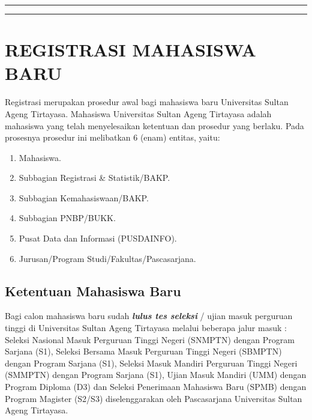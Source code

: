 \documentclass[
]{book}
\providecommand{\tightlist}{%
  \setlength{\itemsep}{0pt}\setlength{\parskip}{0pt}}
\begin{document}
\begin{center}\rule{0.5\linewidth}{0.5pt}\end{center}

\begin{center}\rule{0.5\linewidth}{0.5pt}\end{center}

\hypertarget{registrasi-mahasiswa-baru}{%
\chapter{REGISTRASI MAHASISWA BARU}\label{registrasi-mahasiswa-baru}}

Registrasi merupakan prosedur awal bagi mahasiswa baru Universitas Sultan Ageng Tirtayasa. Mahasiswa Universitas Sultan Ageng Tirtayasa adalah mahasiswa yang telah menyelesaikan ketentuan dan prosedur yang berlaku. Pada prosesnya prosedur ini melibatkan 6 (enam) entitas, yaitu:

\begin{enumerate}
\def\labelenumi{\arabic{enumi}.}
\tightlist
\item
  Mahasiswa.
\item
  Subbagian Registrasi \& Statistik/BAKP.
\item
  Subbagian Kemahasiswaan/BAKP.
\item
  Subbagian PNBP/BUKK.
\item
  Pusat Data dan Informasi (PUSDAINFO).
\item
  Jurusan/Program Studi/Fakultas/Pascasarjana.
\end{enumerate}

\hypertarget{ketentuan-mahasiswa-baru}{%
\section{Ketentuan Mahasiswa Baru}\label{ketentuan-mahasiswa-baru}}

Bagi calon mahasiswa baru sudah \textbf{\emph{lulus tes seleksi}} / ujian masuk perguruan tinggi di Universitas Sultan Ageng Tirtayasa melalui beberapa jalur masuk : Seleksi Nasional Masuk Perguruan Tinggi Negeri (SNMPTN) dengan Program Sarjana (S1), Seleksi Bersama Masuk Perguruan Tinggi Negeri (SBMPTN) dengan Program Sarjana (S1), Seleksi Masuk Mandiri Perguruan Tinggi Negeri (SMMPTN) dengan Program Sarjana (S1), Ujian Masuk Mandiri (UMM) dengan Program Diploma (D3) dan Seleksi Penerimaan Mahasiswa Baru (SPMB) dengan Program Magister (S2/S3) diselenggarakan oleh Pascasarjana Universitas Sultan Ageng Tirtayasa.
\end{document}
